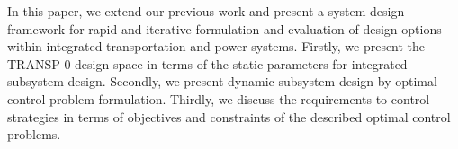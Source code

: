






In this paper, we extend our previous work \cite{Hackenberg2012, ascher2014early, ascher2015integrated} and present a system design framework for rapid and iterative formulation and evaluation of design options within integrated transportation and power systems. Firstly, we present the TRANSP-0 design space in terms of the static parameters for integrated subsystem design. Secondly, we present dynamic subsystem design by optimal control problem formulation. Thirdly, we discuss the requirements to control strategies in terms of objectives and constraints of the described optimal control problems.

